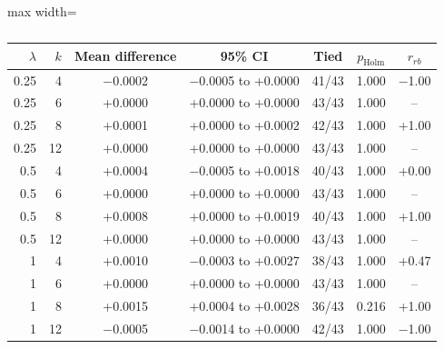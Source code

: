 \begin{table}[htbp]
\centering
\small
\caption{}
\label{tab:lambda}
\setlength{\tabcolsep}{4pt}
\begin{adjustbox}{max width=\textwidth}
\begin{tabular}{rrccccc}
\toprule
$\lambda$ & $k$ & Mean difference & 95\% CI & Tied & $p_{\mathrm{Holm}}$ & $r_{rb}$ \\
\midrule
0.25 & 4 & $-$0.0002 & $-$0.0005 to +0.0000 & 41/43 & 1.000 & $-$1.00 \\
0.25 & 6 & +0.0000 & +0.0000 to +0.0000 & 43/43 & 1.000 & -- \\
0.25 & 8 & +0.0001 & +0.0000 to +0.0002 & 42/43 & 1.000 & +1.00 \\
0.25 & 12 & +0.0000 & +0.0000 to +0.0000 & 43/43 & 1.000 & -- \\
0.5 & 4 & +0.0004 & $-$0.0005 to +0.0018 & 40/43 & 1.000 & +0.00 \\
0.5 & 6 & +0.0000 & +0.0000 to +0.0000 & 43/43 & 1.000 & -- \\
0.5 & 8 & +0.0008 & +0.0000 to +0.0019 & 40/43 & 1.000 & +1.00 \\
0.5 & 12 & +0.0000 & +0.0000 to +0.0000 & 43/43 & 1.000 & -- \\
1 & 4 & +0.0010 & $-$0.0003 to +0.0027 & 38/43 & 1.000 & +0.47 \\
1 & 6 & +0.0000 & +0.0000 to +0.0000 & 43/43 & 1.000 & -- \\
1 & 8 & +0.0015 & +0.0004 to +0.0028 & 36/43 & 0.216 & +1.00 \\
1 & 12 & $-$0.0005 & $-$0.0014 to +0.0000 & 42/43 & 1.000 & $-$1.00 \\
\bottomrule
\end{tabular}
\end{adjustbox}
\end{table}

